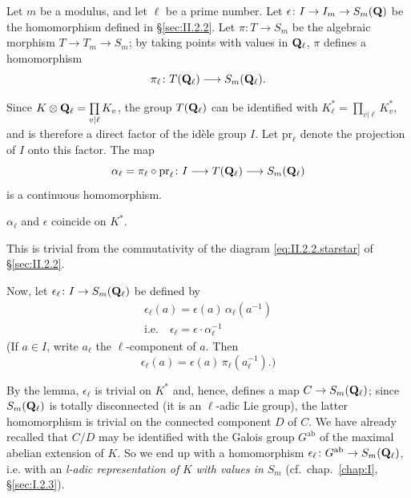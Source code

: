 
Let $m$ be a modulus, and let $\ell$ be a prime number.  Let
$\epsilon\colon I \to I_m \to S_m(\mathbf{Q})$ be the homomorphism defined in
\S\ref{sec:II.2.2}.  Let $\pi\colon T \to S_m$ be the algebraic morphism
$T \to T_m \to S_m$; by taking points with values in $\mathbf{Q}_\ell$, $\pi$
defines a homomorphism
\[
\pi_\ell\colon T(\mathbf{Q}_\ell) \longrightarrow S_m(\mathbf{Q}_\ell).
\]

Since $K \mathbin{\otimes} \mathbf{Q}_\ell = \prod\limits_{v|\ell} K_v$, the group
$T(\mathbf{Q}_\ell)$ can be identified with
$K_\ell^* = \prod\limits_{v|\ell} K_v^*$, and is therefore a direct
factor of the idèle group $I$.  Let $\mathrm{pr}_\ell$ denote the
projection of $I$ onto this factor.  The map
\[
\alpha_\ell = \pi_\ell \circ \mathrm{pr}_\ell\colon I
\longrightarrow T(\mathbf{Q}_\ell) \longrightarrow S_m(\mathbf{Q}_\ell)
\]
is a continuous homomorphism.

\begin{lemma}
$\alpha_\ell$ and $\epsilon$ coincide on $K^*$.
\end{lemma}

This is trivial from the commutativity of the diagram
\eqref{eq:II.2.2.starstar} of \S\ref{sec:II.2.2}.

Now, let $\epsilon_\ell\colon I \to S_m(\mathbf{Q}_\ell)$ be defined by
\begin{equation}
\tag{***}\label{eq:II.2.3.starstarstar}
\begin{gathered}
\epsilon_\ell(a) = \epsilon(a)\,\alpha_\ell(a^{-1})\\
\text{i.e.}\quad \epsilon_\ell = \epsilon \cdot \alpha_\ell^{-1}
\end{gathered}
\end{equation}
(If $a \in I$, write $a_\ell$ the $\ell$-component of $a$.  Then
\[
\epsilon_\ell(a) = \epsilon(a)\,\pi_\ell(a_\ell^{-1}).)
\]

By the lemma, $\epsilon_\ell$ is trivial on $K^*$ and, hence, defines a
map $C \to S_m(\mathbf{Q}_\ell)$; since $S_m(\mathbf{Q}_\ell)$ is totally disconnected
(it is an $\ell$-adic Lie group), the latter homomorphism is trivial on
the connected component $D$ of $C$.  We have already recalled that $C/D$
may be identified with the Galois group $G^{\mathrm{ab}}$ of the maximal
abelian extension of $K$.  So we end up with a homomorphism
$\epsilon_\ell\colon G^{\mathrm{ab}} \to S_m(\mathbf{Q}_\ell)$, i.e.  with an
\emph{\textit{l}-adic representation of} $K$ \emph{with values in} $S_m$
(cf.~chap.~\ref{chap:I}, \S\ref{sec:I.2.3}).

